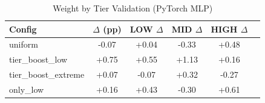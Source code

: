 \begin{table}[htbp]
\centering
\caption{Weight by Tier Validation (PyTorch MLP)}
\label{tab:pytorch_weight_tier}
\begin{tabular}{lccccc}
\toprule
Config & $\Delta$ (pp) & LOW $\Delta$ & MID $\Delta$ & HIGH $\Delta$ \\
\midrule
uniform & -0.07 & +0.04 & -0.33 & +0.48 \\
tier\_boost\_low & +0.75 & +0.55 & +1.13 & +0.16 \\
tier\_boost\_extreme & +0.07 & -0.07 & +0.32 & -0.27 \\
only\_low & +0.16 & +0.43 & -0.30 & +0.61 \\
\bottomrule
\end{tabular}
\end{table}